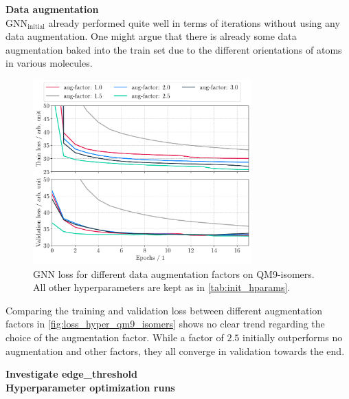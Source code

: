 \textbf{Data augmentation}\\
$\text{GNN}_\text{initial}$ already performed quite well in terms of iterations without using any data augmentation. One might argue that there is already some data augmentation baked into the train set due to the different orientations of atoms in various molecules. 
\begin{figure}[h]
    \centering
    \includegraphics[width=0.75\textwidth]{../fig/application/aug_train_val_loss.pdf}
    \caption[GNN loss different augmentation factors | QM9-isomers]{GNN loss for different data augmentation factors on QM9-isomers. All other hyperparameters are kept as in \autoref{tab:init_hparams}.}
    \label{fig:loss_hyper_qm9_isomers}
\end{figure}
Comparing the training and validation loss between different augmentation factors in \autoref{fig:loss_hyper_qm9_isomers} shows no clear trend regarding the choice of the augmentation factor. While a factor of $2.5$ initially outperforms no augmentation and other factors, they all converge in validation towards the end. 

\textbf{Investigate edge\_threshold}\\

\textbf{Hyperparameter optimization runs}\\


